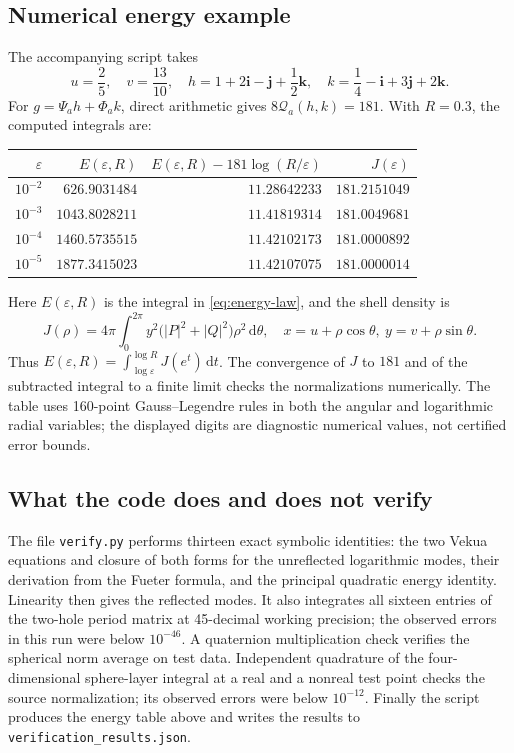 \documentclass[11pt,a4paper]{article}
\numberwithin{equation}{section}
\theoremstyle{definition}
\theoremstyle{remark}
\newcommand{\dd}{\,\mathrm d}
\newcommand{\ii}{\mathbf i}
\newcommand{\jj}{\mathbf j}
\newcommand{\kk}{\mathbf k}
\begin{document}
\subsection{Numerical energy example}
The accompanying script takes
\[
 u=\frac25,\quad v=\frac{13}{10},\quad
 h=1+2\ii-\jj+\frac12\kk,\quad
 k=\frac14-\ii+3\jj+2\kk.
\]
For $g=\Psi_a h+\Phi_a k$, direct arithmetic gives
$8\mathcal Q_a(h,k)=181$. With $R=0.3$, the computed integrals are:
\begin{center}
\renewcommand{\arraystretch}{1.17}
\begin{tabular}{@{}rrrr@{}}
\toprule
$\varepsilon$ & $E(\varepsilon,R)$ &
$E(\varepsilon,R)-181\log(R/\varepsilon)$ & $J(\varepsilon)$\\
\midrule
$10^{-2}$ & $626.9031484$ & $11.28642233$ & $181.2151049$\\
$10^{-3}$ & $1043.8028211$ & $11.41819314$ & $181.0049681$\\
$10^{-4}$ & $1460.5735515$ & $11.42102173$ & $181.0000892$\\
$10^{-5}$ & $1877.3415023$ & $11.42107075$ & $181.0000014$\\
\bottomrule
\end{tabular}
\end{center}
Here $E(\varepsilon,R)$ is the integral in
\eqref{eq:energy-law}, and the shell density is
\[
 J(\rho)=4\pi\int_0^{2\pi}
       y^2\bigl(|P|^2+|Q|^2\bigr)\rho^2\dd\theta,
 \quad x=u+\rho\cos\theta,\ y=v+\rho\sin\theta.
\]
Thus $E(\varepsilon,R)=\int_{\log\varepsilon}^{\log R}J(e^t)\dd t$.
The convergence of $J$ to $181$ and of the subtracted integral to a
finite limit checks the normalizations numerically. The table uses
160-point Gauss--Legendre rules in both the angular and logarithmic
radial variables; the displayed digits are diagnostic numerical values,
not certified error bounds.

\subsection{What the code does and does not verify}
The file \texttt{verify.py} performs thirteen exact symbolic identities:
the two Vekua equations and closure of both forms for the unreflected
logarithmic modes, their derivation from the Fueter formula, and the
principal quadratic energy identity. Linearity then gives the reflected
modes. It also integrates all sixteen entries of the two-hole period
matrix at 45-decimal working precision; the observed errors in this
run were below $10^{-46}$. A quaternion multiplication check verifies
the spherical norm average on test data. Independent quadrature of the
four-dimensional sphere-layer integral at a real and a nonreal test point
checks the source normalization; its observed errors were below $10^{-12}$.
Finally the script produces the energy
table above and writes the results to \texttt{verification\_results.json}.
\end{document}
